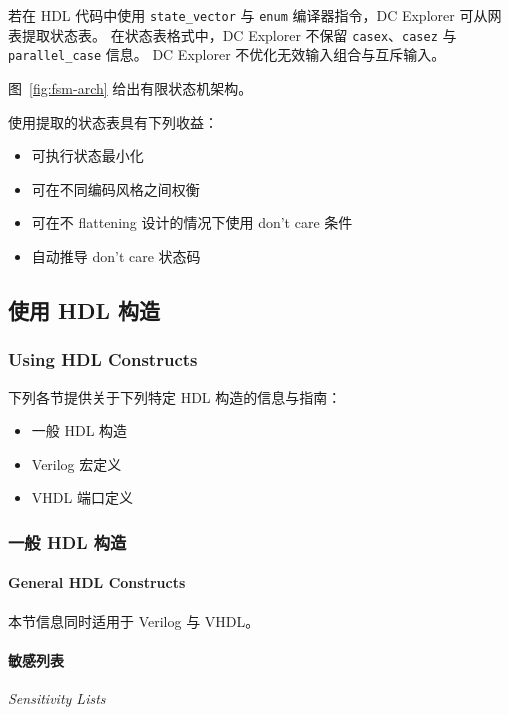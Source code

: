 若在 HDL 代码中使用 \texttt{state\_vector} 与 \texttt{enum} 编译器指令，DC Explorer 可从网表提取状态表。
在状态表格式中，DC Explorer 不保留 \texttt{casex}、\texttt{casez} 与 \texttt{parallel\_case} 信息。
DC Explorer 不优化无效输入组合与互斥输入。

图~\ref{fig:fsm-arch} 给出有限状态机架构。


使用提取的状态表具有下列收益：
\begin{itemize}
  \item 可执行状态最小化
  \item 可在不同编码风格之间权衡
  \item 可在不 flattening 设计的情况下使用 don't care 条件
  \item 自动推导 don't care 状态码
\end{itemize}

\subsection{使用 HDL 构造}
\subsubsection*{Using HDL Constructs}

下列各节提供关于下列特定 HDL 构造的信息与指南：
\begin{itemize}
  \item 一般 HDL 构造
  \item Verilog 宏定义
  \item VHDL 端口定义
\end{itemize}

\subsubsection{一般 HDL 构造}
\paragraph*{General HDL Constructs}

本节信息同时适用于 Verilog 与 VHDL。

\paragraph{敏感列表}
\textit{Sensitivity Lists}

